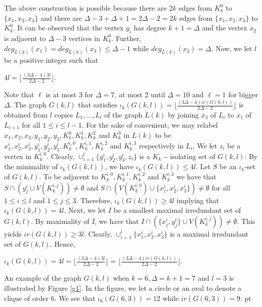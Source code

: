 \documentclass[11pt]{article}
\newcommand{\2}{ \vspace{0.2cm} }
\newcommand{\1}{ \vspace{0.1cm} }
\begin{document}
\noindent The above construction is possible because there are $2k$ edges from $K^{0}_{k}$ to $\{x_{1}, x_{2}, x_{3}\}$ and there are $\Delta - 3 + \Delta + 1 = 2\Delta - 2 = 2k$ edges from $\{x_{1}, x_{2}, x_{3}\}$ to $K^{0}_{k}$. It can be observed that the vertex $y_{i}$ has degree $k + 1 = \Delta$ and the vertex $x_{2}$ is adjacent to $\Delta - 3$ vertices in $K^{0}_{k}$. Further, $deg_{L(k)}(x_{1}) = deg_{L(k)}(x_{3}) \leq \Delta - 1$ while $deg_{L(k)}(x_{2}) = \Delta$. Now, we let $l$ be a positive integer such that
\begin{center}
$4l = \lfloor\frac{(3\Delta - 4)3l}{2\Delta - 2}\rfloor$.
\end{center}
Note that $\ell$ is at most 3 for $\Delta =7$, at most 2 until $\Delta =10$ and $\ell=1$ for bigger $\Delta$.
\noindent The graph $G(k, l)$ that satisfies $\iota_{k}(G(k, l)) = \Big\lfloor\frac{(3\Delta - 4)ir(G(k, l))}{2\Delta - 2}\Big\rfloor$ is obtained from $l$ copies $L_{1}, ..., L_{l}$ of the graph $L(k)$ by joining $x_{3}$ of $L_{i}$ to $x_{1}$ of $L_{i + 1}$ for all $1 \leq i \leq l - 1$. For the sake of convenient, we may relabel $x_{1}, x_{2}, x_{3}, y_{1}, y_{2}, y_{3}, K^{0}_{k}, K^{1}_{k}, K^{2}_{k}$ and $K^{3}_{k}$ in $L(k)$ to be $x^{i}_{1}, x^{i}_{2}, x^{i}_{3}, y^{i}_{1}, y^{i}_{2}, y^{i}_{3}, K^{i, 0}_{k}, K^{i, 1}_{k}, K^{i, 2}_{k}$ and $K^{i, 3}_{k}$ respectively in $L_{i}$. We let $z_{i}$ be a vertex in $K^{i, 0}_{k}$. Clearly, $\cup^{l}_{i = 1}\{y^{i}_{1}, y^{i}_{2}, y^{i}_{3}, z_{i}\}$ is  a $K_k-$isolating set of $G(k, l)$. By the minimality of $\iota_{k}(G(k, l))$, we have $\iota_{k}(G(k, l)) \leq 4l$. Let $S$ be an $\iota_{k}$-set of $G(k, l)$. To be adjacent to $K^{i, 0}_{k}, K^{i, 1}_{k}, K^{i, 2}_{k}$ and $K^{i, 3}_{k}$ we have that $S \cap (y^{i}_{j} \cup V(K^{i, j}_{k})) \neq \emptyset$ and $S \cap (V(K^{i, 0}_{k}) \cup \{x^{i}_{1}, x^{i}_{2}, x^{i}_{3}\}) \neq \emptyset$ for all $1 \leq i \leq l$ and $1 \leq j \leq 3$. Therefore, $\iota_{k}(G(k, l)) \geq 4l$ implying that $\iota_{k}(G(k, l)) = 4l$. Next, we let $I$ be a smallest maximal irredundant set of $G(k, l)$. By maximality of $I$, we have that $I \cap (\{x^{i}_{j}, y^{i}_{j}\} \cup V(K^{i, j}_{k})) \neq \emptyset$. This yields $ir(G(k, l)) \geq 3l$. Clearly, $\cup^{l}_{i = 1}\{x^{i}_{1}, x^{i}_{2}, x^{i}_{3}\}$ is a maximal irredundant set of $G(k, l)$. Hence,
\begin{center}
$\iota_{k}(G(k, l)) = 4l = \lfloor\frac{(3\Delta - 4)3l}{2\Delta - 2}\rfloor = \lfloor\frac{(3\Delta - 4)ir(G(k, l))}{2\Delta - 2}\rfloor$.
\end{center}
\noindent An example of the graph $G(k, l)$ when
$k = 6, \Delta = k + 1 = 7$ and $l = 3$ is illustrated by Figure \ref{g1}. In the figure, we let a circle or an oval to denote a clique of order $6$. We see that $\iota_{6}(G(6, 3)) = 12$ while $ir(G(6, 3)) = 9$.
 pt
\end{document}
